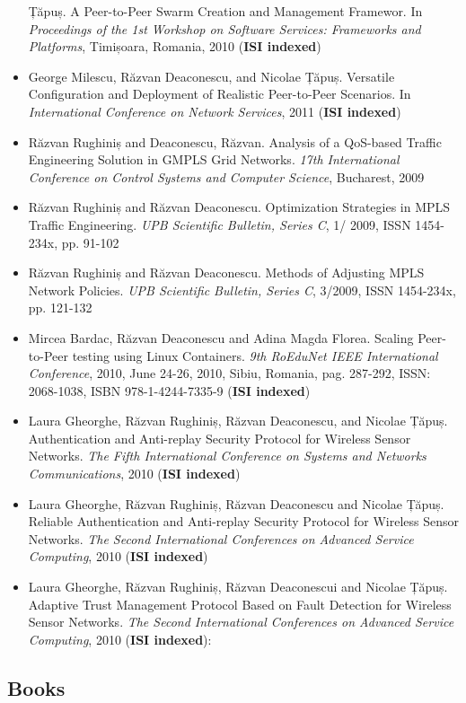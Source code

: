 \begin{itemize}
  Țăpuș. A Peer-to-Peer Swarm Creation and Management Framewor. In
  \textit{Proceedings of the 1st Workshop on Software Services: Frameworks and
  Platforms}, Timișoara, Romania, 2010 (\textbf{ISI indexed})
  \item George Milescu, Răzvan Deaconescu, and Nicolae Țăpuș. Versatile
  Configuration and Deployment of Realistic Peer-to-Peer Scenarios. In
  \textit{International Conference on Network Services}, 2011 (\textbf{ISI
  indexed})
  \item Răzvan Rughiniș and Deaconescu, Răzvan. Analysis of a QoS-based
  Traffic Engineering Solution in GMPLS Grid Networks. \textit{17th
  International Conference on Control Systems and Computer Science},
  Bucharest, 2009
  \item Răzvan Rughiniș and Răzvan Deaconescu. Optimization Strategies in MPLS
  Traffic Engineering. \textit{UPB Scientific Bulletin, Series C}, 1/ 2009,
  ISSN 1454-234x, pp. 91-102
  \item Răzvan Rughiniș and Răzvan Deaconescu. Methods of Adjusting MPLS
  Network Policies. \textit{UPB Scientific Bulletin, Series C}, 3/2009, ISSN
  1454-234x, pp. 121-132
  \item Mircea Bardac, Răzvan Deaconescu and Adina Magda Florea. Scaling
  Peer-to-Peer testing using Linux Containers. \textit{9th RoEduNet IEEE
  International Conference}, 2010, June 24-26, 2010, Sibiu, Romania, pag.
  287-292, ISSN: 2068-1038, ISBN 978-1-4244-7335-9 (\textbf{ISI indexed})
  \item Laura Gheorghe, Răzvan Rughiniș, Răzvan Deaconescu, and Nicolae Țăpuș.
  Authentication and Anti-replay Security Protocol for Wireless Sensor
  Networks. \textit{The Fifth International Conference on Systems and Networks
  Communications}, 2010 (\textbf{ISI indexed})
  \item Laura Gheorghe, Răzvan Rughiniș, Răzvan Deaconescu and Nicolae Țăpuș.
  Reliable Authentication and Anti-replay Security Protocol for Wireless
  Sensor Networks. \textit{The Second International Conferences on Advanced
  Service Computing}, 2010 (\textbf{ISI indexed})
  \item Laura Gheorghe, Răzvan Rughiniș, Răzvan Deaconescui and Nicolae Țăpuș.
  Adaptive Trust Management Protocol Based on Fault Detection for Wireless
  Sensor Networks. \textit{The Second International Conferences on Advanced
  Service Computing}, 2010 (\textbf{ISI indexed}):
\end{itemize}

\subsection{Books}

